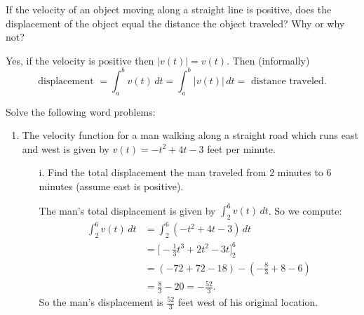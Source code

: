 \documentclass[nooutcomes, handout]{ximera}
\renewcommand{\d}{\,d}
\newcommand{\eval}[1]{\bigg[ #1 \bigg]}
\begin{document}
\begin{problem}
  If the velocity of an object moving along a straight line is
  positive, does the displacement of the object equal the distance the
  object traveled?  Why or why not?
  \begin{freeResponse}
    Yes, if the velocity is positive then $\left| v(t) \right|=v(t)$.
    Then (informally)
    \begin{equation*}
      \text{displacement } = \int_a^b v(t) \d t = \int_a^b \left| v(t) \right| \d t = \text{ distance traveled}.
    \end{equation*}
  \end{freeResponse}
\end{problem}





\begin{problem}
Solve the following word problems:

	\begin{enumerate}
	
	\item  The velocity function for a man walking along a straight road which runs east and west is given by 
	$v(t) = -t^2 + 4t - 3$ feet per minute.
		
		\begin{enumerate}
		
		\item[i.]  Find the total displacement the man traveled from $2$ minutes to $6$ minutes (assume east is positive). 
			\begin{freeResponse}
			The man's total displacement is given by $\int_2^6 v(t) \d t$.  So we compute:
				\begin{align*}
				\int_2^6 v(t) \d t &= \int_2^6 (-t^2 + 4t - 3) \d t  \\
				&= \eval{- \frac{1}{3} t^3 + 2t^2 - 3t}_2^6  \\
				&= (-72 + 72 - 18) - \left( - \frac{8}{3} + 8 - 6 \right)  \\
				&= \frac{8}{3} - 20 = - \frac{52}{3}.
				\end{align*}
			So the man's displacement is $\frac{52}{3}$ feet west of his original location.
			\end{freeResponse}
				

\end{enumerate}
\end{enumerate}
\end{problem}
\end{document}
